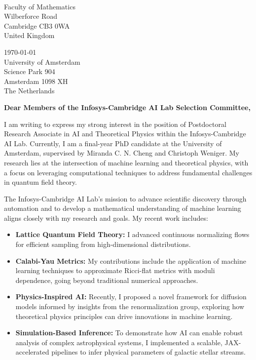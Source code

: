 \documentclass[11pt]{article}
\title{}
\author{}
\date{}
\begin{document}
\thispagestyle{firstpagestyle}

\noindent
\begin{minipage}[t]{0.5\textwidth}
\phantom{
\today \\
}
\vspace{0.2cm} \\
Faculty of Mathematics \\
Wilberforce Road \\
Cambridge CB3 0WA \\
United Kingdom \\


\end{minipage}
\begin{minipage}[t]{0.5\textwidth}
\flushright
\today \\
\vspace{0.2cm}
University of Amsterdam \\
Science Park 904 \\
Amsterdam 1098 XH \\
The Netherlands \\
\end{minipage}

\vspace{20pt}

\noindent
\textbf{Dear Members of the Infosys-Cambridge AI Lab Selection Committee,}

I am writing to express my strong interest in the position of Postdoctoral Research Associate in AI and Theoretical Physics within the Infosys-Cambridge AI Lab. Currently, I am a final-year PhD candidate at the University of Amsterdam, supervised by Miranda C. N. Cheng and Christoph Weniger.
My research lies at the intersection of machine learning and theoretical physics, with a focus on leveraging computational techniques to address fundamental challenges in quantum field theory.

The Infosys-Cambridge AI Lab's mission to advance scientific discovery through automation and to develop a mathematical understanding of machine learning aligns closely with my research  and goals. My recent work includes:
\begin{itemize}
    \item \textbf{Lattice Quantum Field Theory:} I advanced continuous normalizing flows for efficient sampling from high-dimensional distributions.
    \item \textbf{Calabi-Yau Metrics:} My contributions include the application of machine learning techniques to approximate Ricci-flat metrics with moduli dependence, going beyond traditional numerical approaches.
    \item \textbf{Physics-Inspired AI:} Recently, I proposed a novel framework for diffusion models informed by insights from the renormalization group, exploring how theoretical physics principles can drive innovations in machine learning.
    \item \textbf{Simulation-Based Inference:} To demonstrate how AI can enable robust analysis of complex astrophysical systems, I implemented a scalable, JAX-accelerated pipelines to infer physical parameters of galactic stellar streams.
\end{itemize}
\end{document}
